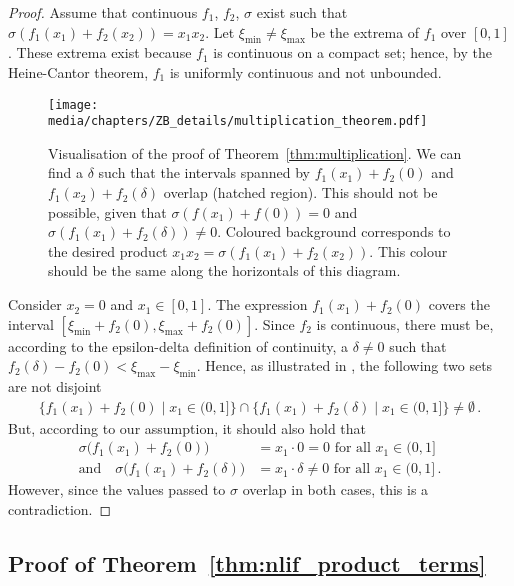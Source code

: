 \begin{proof}
Assume that continuous $f_1$, $f_2$, $\sigma$ exist such that $\sigma(f_1(x_1) + f_2(x_2)) = x_1 x_2$.
Let $\xi_\mathrm{min} \neq \xi_\mathrm{max}$ be the extrema of $f_1$ over $[0, 1]$.
These extrema exist because $f_1$ is continuous on a compact set; hence, by the Heine-Cantor theorem, $f_1$ is uniformly continuous and not unbounded.


\begin{figure}[t]
	\centering
	\texttt{[image: media/chapters/ZB\_details/multiplication\_theorem.pdf]}
	\caption[Visualisation of the proof of Theorem~\ref{thm:multiplication}]{Visualisation of the proof of Theorem~\ref{thm:multiplication}.
	We can find a $\delta$ such that the intervals spanned by $f_1(x_1) + f_2(0)$ and $f_1(x_2) + f_2(\delta)$ overlap (hatched region).
	This should not be possible, given that $\sigma(f(x_1) + f(0)) = 0$ and $\sigma(f_1(x_1) + f_2(\delta)) \neq 0$.
	Coloured background corresponds to the desired product $x_1 x_2 = \sigma(f_1(x_1) + f_2(x_2))$.
	This colour should be the same along the horizontals of this diagram.}
	\label{fig:multiplication_theorem}
\end{figure}

Consider $x_2 = 0$ and $x_1 \in [0, 1]$.
The expression $f_1(x_1) + f_2(0)$ covers the interval $[\xi_\mathrm{min} + f_2(0) , \xi_\mathrm{max} + f_2(0)]$.
Since $f_2$ is continuous, there must be, according to the epsilon-delta definition of continuity, a $\delta \neq 0$ such that $f_2(\delta) - f_2(0) < \xi_\mathrm{max} - \xi_\mathrm{min}$.
Hence, as illustrated in , the following two sets are not disjoint
\begin{align*}
	\bigl\{ f_1(x_1) + f_2(0) \mid x_1 \in (0, 1] \bigr\} \cap \bigl\{ f_1(x_1) + f_2(\delta) \mid x_1 \in (0, 1] \bigr\} \neq \emptyset \,.
\end{align*}
But, according to our assumption, it should also hold that
\begin{align*}
	\sigma\bigl(f_1(x_1) + f_2(0)\bigr) &= x_1 \cdot 0 = 0 \text{ for all } x_1 \in (0, 1] \\
	\text{and} \quad \sigma\bigl(f_1(x_1) + f_2(\delta)\bigr) &= x_1 \cdot \delta \neq 0 \text{ for all } x_1 \in (0, 1] \,.
\end{align*}
However, since the values passed to $\sigma$ overlap in both cases, this is a contradiction. \Lightning
\end{proof}


\subsection{Proof of Theorem~\ref{thm:nlif_product_terms}}
\label{app:nlif_product_terms}

